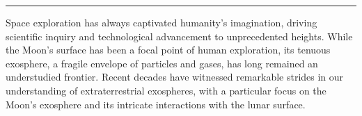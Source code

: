 \documentclass[
  letterpaper,
  DIV=11,
  numbers=noendperiod,
  oneside]{scrartcl}
\begin{document}
\newcommand{\BoltzmannConstant}{k_B}
\newcommand{\BoltzmannConstantValue}{\SI{1.38e-23}{\joule\per\kelvin}}
\newcommand{\GasConstant}{R}

\newcommand{\GravitationalConstant}{G}
\newcommand{\GravitationalConstantValue}{\SI{6.674e-11}{\metre\cubed\per\kilo\gram\per\second\squared}}
\newcommand{\StefanBoltzmannConstant}{\sigma}
\newcommand{\StefanBoltzmannConstantValue}{\SI{5.67e-8}{\watt\per\metre\squared\per\kelvin\tothe{4}}}
\newcommand{\PlanckConstant}{h}
\newcommand{\PlanckConstantValue}{\SI{6.626e-34}{\metre\squared\kilo\gram\per\second}}

\begin{center}\rule{0.5\linewidth}{0.5pt}\end{center}

Space exploration has always captivated humanity's imagination, driving
scientific inquiry and technological advancement to unprecedented
heights. While the Moon's surface has been a focal point of human
exploration, its tenuous exosphere, a fragile envelope of particles and
gases, has long remained an understudied frontier. Recent decades have
witnessed remarkable strides in our understanding of extraterrestrial
exospheres, with a particular focus on the Moon's exosphere and its
intricate interactions with the lunar surface.
\end{document}
